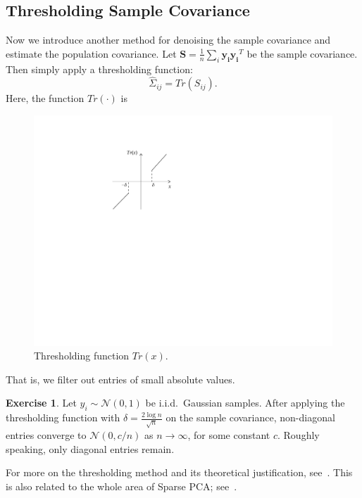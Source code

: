 \documentclass[11pt]{article}
\theoremstyle{definition}
\newtheorem{exercise}{Exercise}
\begin{document}
\subsection{Thresholding Sample Covariance}
Now we introduce another method for denoising the sample covariance and estimate the population covariance. Let $\mathbf{S}= \frac{1}{n}\sum_{i}\mathbf{y_i}\mathbf{y_i}^T$ be the sample covariance. Then simply apply a thresholding function: $$\widehat{\Sigma}_{ij} = Tr(S_{ij}).$$ Here, the function $Tr(\cdot)$ is 
\begin{figure}[htbp]
    \centering
    \includegraphics[scale=.85]{./fig/tr.pdf}
    \caption{Thresholding function $Tr(x)$.}
\end{figure}

That is, we filter out entries of small absolute values.
\begin{exercise}
    Let $y_i\sim \mathcal{N}(0,1)$ be i.i.d.\ Gaussian samples. After applying the thresholding function with $\delta = \frac{2\log n}{\sqrt{n}}$ on the sample covariance,  non-diagonal entries converge to $\mathcal{N}(0,c/n)$ as $n\rightarrow \infty$, for some constant $c$. Roughly speaking, only diagonal entries remain.
\end{exercise}

For more on the thresholding method and its theoretical justification, see~\cite{bickel2008covariance}. This is also related to the whole area of Sparse PCA; see~\cite{johnstone2009consistency}.
\end{document}
